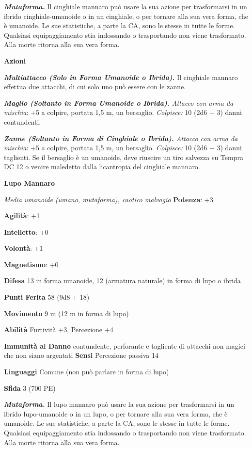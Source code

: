\begin{multicols}{2}
\emph{\textbf{Mutaforma.}} Il cinghiale mannaro può usare la sua azione
per trasformarsi in un ibrido cinghiale-umanoide o in un cinghiale, o
per tornare alla sua vera forma, che è umanoide. Le sue statistiche, a
parte la CA, sono le stesse in tutte le forme. Qualsiasi equipaggiamento
stia indossando o trasportando non viene trasformato. Alla morte ritorna
alla sua vera forma.

\textbf{Azioni}

\emph{\textbf{Multiattacco (Solo in Forma Umanoide o Ibrida).}} Il
cinghiale mannaro effettua due attacchi, di cui solo uno può essere con
le zanne.

\emph{\textbf{Maglio (Soltanto in Forma Umanoide o Ibrida).} Attacco con
arma da mischia}: +5 a colpire, portata 1,5 m, un bersaglio.
\emph{Colpisce:} 10 (2d6 + 3) danni contundenti.

\emph{\textbf{Zanne (Soltanto in Forma di Cinghiale o Ibrida).} Attacco
con arma da mischia}: +5 a colpire, portata 1,5 m, un bersaglio.
\emph{Colpisce:} 10 (2d6 + 3) danni taglienti. Se il bersaglio è un
umanoide, deve riuscire un tiro salvezza su Tempra DC 12 o venire
maledetto dalla licantropia del cinghiale mannaro.

\textbf{Lupo Mannaro}

\emph{Media umanoide (umano, mutaforma), caotico malvagio}
\textbf{Potenza}: +3

\textbf{Agilità}: +1

\textbf{Intelletto}: +0

\textbf{Volontà}: +1

\textbf{Magnetismo}: +0

\textbf{Difesa} 13 in forma umanoide, 12 (armatura naturale) in
forma di lupo o ibrida

\textbf{Punti Ferita} 58 (9d8 + 18)

\textbf{Movimento} 9 m (12 m in forma di lupo)

\textbf{Abilità} Furtività +3, Percezione +4

\textbf{Immunità al Danno} contundente, perforante e tagliente di
attacchi non magici che non siano argentati \textbf{Sensi} Percezione
passiva 14

\textbf{Linguaggi} Comune (non può parlare in forma di lupo)

\textbf{Sfida} 3 (700 PE)

\emph{\textbf{Mutaforma.}} Il lupo mannaro può usare la sua azione per
trasformarsi in un ibrido lupo-umanoide o in un lupo, o per tornare alla
sua vera forma, che è umanoide. Le sue statistiche, a parte la CA, sono
le stesse in tutte le forme. Qualsiasi equipaggiamento stia indossando o
trasportando non viene trasformato. Alla morte ritorna alla sua vera
forma.


\end{multicols}
